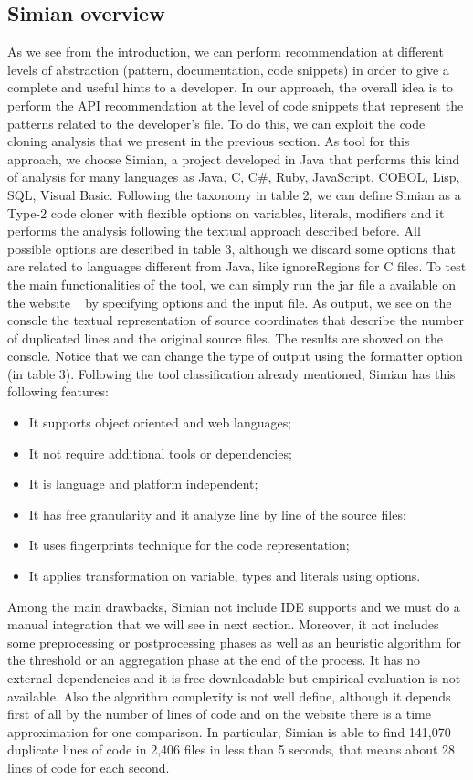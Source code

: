 \subsection{Simian overview}
As we see from the introduction, we can perform recommendation at different levels of abstraction (pattern, documentation, code snippets) in order to give a complete and useful hints to a developer. In our approach, the overall idea is to perform the API recommendation at the level of code snippets that represent the patterns related to the developer's file. To do this, we can exploit the code cloning analysis that we present in the previous section. As tool for this approach, we choose Simian, a project developed in Java that performs this kind of analysis for many languages as Java, C, C\#, Ruby, JavaScript, COBOL, Lisp, SQL, Visual Basic. Following the taxonomy in table 2, we can define Simian as a Type-2 code cloner with flexible options on variables, literals, modifiers and it performs the analysis following the textual approach described before. All possible options are described in table 3, although we discard some options that are related to languages different from Java, like ignoreRegions for C files. To test the main functionalities of the tool, we can simply run the jar file a available on the website   ~\cite{https://www.harukizaemon.com/simian/_last_nodate} by specifying options and the input file. As output, we see on the console the textual representation of source coordinates that describe the number of duplicated lines and the original source files. The results are showed on the console. Notice that we can change the type of output using the formatter option (in table 3). 
Following the tool classification already mentioned, Simian has this following features: 
\begin{itemize}
\item It supports object oriented and web languages;
\item It not require additional tools or dependencies;
\item It is language and platform independent;
\item It has free granularity and it analyze line by line of the source files;
\item It uses fingerprints technique for the code representation;
\item It applies transformation on variable, types and literals using options.
\end{itemize}
Among the main drawbacks, Simian not include IDE supports and we must do a manual integration that we will see in next section. Moreover, it not includes some preprocessing or postprocessing phases as well as an heuristic algorithm for the threshold or an aggregation phase at the end of the process. It has no external dependencies and it is free downloadable but empirical evaluation is not available. Also the algorithm complexity is not well define, although it depends first of all by the number of lines of code and on the website there is a time approximation for one comparison. In particular, Simian is able to find 141,070 duplicate lines of code in 2,406 files in less than 5 seconds, that means about 28 lines of code for each second. 



